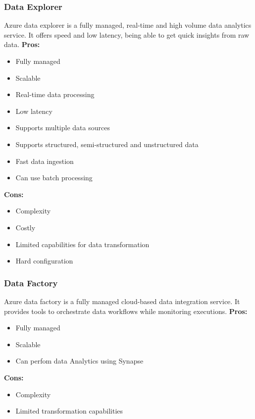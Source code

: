         \subsubsection{Data Explorer}
        \label{azure:data-explorer}
        Azure data explorer is a fully managed, real-time and high volume data analytics service. 
        It offers speed and low latency, being able to get quick insights from raw data.
        \textbf{Pros:}
        \begin{itemize}
            \item Fully managed
            \item Scalable
            \item Real-time data processing
            \item Low latency
            \item Supports multiple data sources
            \item Supports structured, semi-structured and unstructured data
            \item Fast data ingestion
            \item Can use batch processing
        \end{itemize}
        \textbf{Cons:}
        \begin{itemize}
            \item Complexity
            \item Costly
            \item Limited capabilities for data transformation
            \item Hard configuration
        \end{itemize}

        \subsubsection{Data Factory}
        \label{azure:data-factory}
        Azure data factory is a fully managed cloud-based data integration service.
        It provides tools to orchestrate data workflows while monitoring executions.
        \textbf{Pros:}
        \begin{itemize}
            \item Fully managed
            \item Scalable
            \item Can perfom data Analytics using Synapse
        \end{itemize}
        \textbf{Cons:}
        \begin{itemize}
            \item Complexity
            \item Limited transformation capabilities
        \end{itemize}

